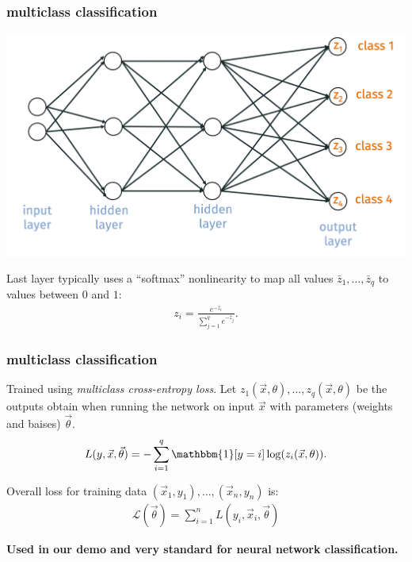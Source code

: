 \documentclass[handout,compress]{beamer}
\begin{document}
	\begin{frame}
	\frametitle{multiclass classification}
	\begin{center}
		\includegraphics[width=.8\textwidth]{multiclass_network.png}
	\end{center}
Last layer typically uses a ``softmax'' nonlinearity to map all values $\bar{z}_1, \ldots, \bar{z}_q$ to values between $0$ and $1$:
\begin{align*}
z_i = \frac{e^{-\bar{z}_i}}{\sum_{j=1}^q e^{-\bar{z}_j}}.
\end{align*}
	\end{frame}

	\begin{frame}
	\frametitle{multiclass classification}
	Trained using \emph{multiclass cross-entropy loss}. Let $z_1(\vec{x},\theta), \ldots, z_q(\vec{x},\theta)$ be the outputs obtain when running the network on input $\vec{x}$ with parameters (weights and baises) $\vec{\theta}$. 
	\begin{align*}
	L(y, \vec{x}, \vec{\theta}) = - \sum_{i=1}^q \mathbbm{1}[y = i] \log(z_i(\vec{x},\theta)).
	\end{align*}
	
	Overall loss for training data $(\vec{x}_1, y_1), \ldots, (\vec{x}_n, y_n)$ is:
	\begin{align*}
	\mathcal{L}(\vec{\theta}) = \sum_{i=1}^n L(y_i, \vec{x}_i, \vec{\theta})
	\end{align*}
	\begin{center}
		\alert{\textbf{Used in our demo and very standard for neural network classification.}}
	\end{center}
	\end{frame}
\end{document}
